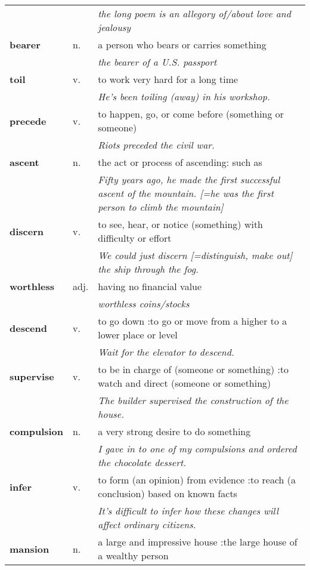 \documentclass[a4paper]{article}
\begin{document}
\begin{longtable}{llp{11cm}}
 & & \textit{the long poem is an allegory of/about love and jealousy}\\[0.08cm]
\textbf{bearer} & n. &  a person who bears or carries something \\
 & & \textit{the bearer of a U.S. passport}\\[0.08cm]
\textbf{toil} & v. &  to work very hard for a long time \\
 & & \textit{He's been toiling (away) in his workshop.}\\[0.08cm]
\textbf{precede} & v. &  to happen, go, or come before (something or someone) \\
 & & \textit{Riots preceded the civil war.}\\[0.08cm]
\textbf{ascent} & n. &  the act or process of ascending: such as\\
 & & \textit{Fifty years ago, he made the first successful ascent of the mountain. [=he was the first person to climb the mountain]}\\[0.08cm]
\textbf{discern} & v. &  to see, hear, or notice (something) with difficulty or effort \\
 & & \textit{We could just discern [=distinguish, make out] the ship through the fog.}\\[0.08cm]
\textbf{worthless} & adj. &  having no financial value \\
 & & \textit{worthless coins/stocks}\\[0.08cm]
\textbf{descend} & v. &  to go down :to go or move from a higher to a lower place or level \\
 & & \textit{Wait for the elevator to descend.}\\[0.08cm]
\textbf{supervise} & v. &  to be in charge of (someone or something) :to watch and direct (someone or something) \\
 & & \textit{The builder supervised the construction of the house.}\\[0.08cm]
\textbf{compulsion} & n. &  a very strong desire to do something \\
 & & \textit{I gave in to one of my compulsions and ordered the chocolate dessert.}\\[0.08cm]
\textbf{infer} & v. &  to form (an opinion) from evidence :to reach (a conclusion) based on known facts \\
 & & \textit{It's difficult to infer how these changes will affect ordinary citizens.}\\[0.08cm]
\textbf{mansion} & n. &  a large and impressive house :the large house of a wealthy person \\

\end{longtable}
\end{document}
